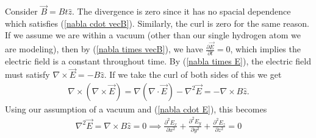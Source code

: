 \documentclass[11pt]{article}
\begin{document}
Consider $\vec{B} = Bt \hat{z}$. The divergence is zero since it has no spacial dependence which satisfies (\ref{nabla cdot vecB}). Similarly, the curl is zero for the same reason. If we assume we are within a vacuum (other than our single hydrogen atom we are modeling), then by (\ref{nabla times vecB}), we have $\frac{\partial \vec{E}}{\partial t} = 0$, which implies the electric field is a constant throughout time. By (\ref{nabla times E}), the electric field must satisfy $\nabla \times \vec{E} = -B \hat{z}$. If we take the curl of both sides of this we get
\begin{align}
\nabla \times(\nabla \times \vec{E}) = \nabla (\nabla \cdot \vec{E}) - \nabla^2 \vec{E} = -\nabla \times B \hat{z}.
\end{align}
Using our assumption of a vacuum and (\ref{nabla cdot E}), this becomes 
\begin{align}
 \nabla^2 \vec{E} = \nabla \times B \hat{z} = 0 \implies \frac{\partial^2 E_x}{\partial x^2}+\frac{\partial^2 E_y}{\partial y^2}+\frac{\partial^2 E_z}{\partial z^2}=0
\end{align}
\end{document}
